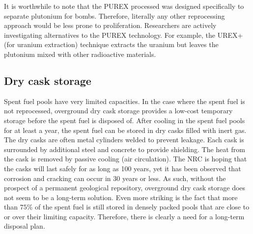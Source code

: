 \documentclass[nofootinbib,preprint,aps]{revtex4-1}
\begin{document}
    It is worthwhile to note that the PUREX processed was designed specifically to separate plutonium for
    bombs. Therefore, literally any other reprocessing approach would be less prone to proliferation.
    Researchers are actively investigating alternatives to the PUREX technology. For example, the UREX+ (for
    uranium extraction) technique extracts the uranium but leaves the plutonium mixed with other
    radioactive materials.\cite{aa12}

    \subsection{Dry cask storage}
    Spent fuel pools have very limited capacities. 
    In the case where the spent fuel is not reprocessed, overground dry cask storage provides a low-cost temporary storage before the spent fuel is disposed of.
    After cooling in the spent fuel pools for at least a year, the spent fuel can be stored in dry casks filled with inert gas. 
The dry casks are often metal cylinders welded to prevent leakage. Each cask is surrounded by
    additional steel and concrete to provide shielding.
    The heat from the cask is removed by passive
    cooling (air circulation). The NRC is hoping that the casks will
    last safely for as long as 100 years, yet it has been observed that corrosion and cracking can occur in 30 years
    or less.\cite{aa12} As such, without the prospect of a permanent geological repository,
    overground dry cask storage does not seem to be a long-term solution.
    Even more striking is the fact that more than $75\%$ of the spent fuel is still stored in densely
    packed pools
    that are close to or over their limiting capacity.\cite{a11,aa12}
    Therefore, there is clearly a need for a long-term disposal plan.
\end{document}

